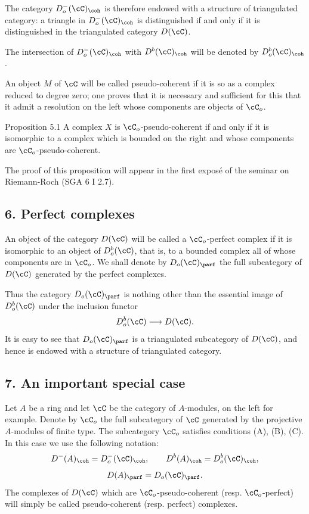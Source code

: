 The category $D_o^-(\cC)_{\coh}$ is therefore endowed with a structure of triangulated category: a triangle in $D_o^-(\cC)_{\coh}$ is distinguished if and only if it is distinguished in the triangulated category $D(\cC)$.

The intersection of $D_o^-(\cC)_{\coh}$ with $D^b(\cC)_{\coh}$ will be denoted by $D_o^b(\cC)_{\coh}$.

An object $M$ of $\cC$ will be called pseudo-coherent if it is so as a complex reduced to degree zero; one proves that it is necessary and sufficient for this that it admit a resolution on the left whose components are objects of $\cC_o$.

\begin{statement}{Proposition 5.1}
A complex $X$ is $\cC_o$-pseudo-coherent if and only if it is isomorphic to a complex which is bounded on the right and whose components are $\cC_o$-pseudo-coherent.
\end{statement}

The proof of this proposition will appear in the first exposé of the seminar on Riemann-Roch (SGA 6 I 2.7).

\subsection*{6. Perfect complexes}

An object of the category $D(\cC)$ will be called a $\cC_o$-perfect complex if it is isomorphic to an object of $D_o^b(\cC)$, that is, to a bounded complex all of whose components are in $\cC_o$. We shall denote by $D_o(\cC)_{\parf}$ the full subcategory of $D(\cC)$ generated by the perfect complexes.

Thus the category $D_o(\cC)_{\parf}$ is nothing other than the essential image of $D_o^b(\cC)$ under the inclusion functor
\[
D_o^b(\cC)\longrightarrow D(\cC).
\]
It is easy to see that $D_o(\cC)_{\parf}$ is a triangulated subcategory of $D(\cC)$, and hence is endowed with a structure of triangulated category.

\subsection*{7. An important special case}

Let $A$ be a ring and let $\cC$ be the category of $A$-modules, on the left for example. Denote by $\cC_o$ the full subcategory of $\cC$ generated by the projective $A$-modules of finite type. The subcategory $\cC_o$ satisfies conditions (A), (B), (C). In this case we use the following notation:
\[
D^-(A)_{\coh}=D_o^-(\cC)_{\coh},\qquad
D^b(A)_{\coh}=D_o^b(\cC)_{\coh},
\]
\[
D(A)_{\parf}=D_o(\cC)_{\parf}.
\]
The complexes of $D(\cC)$ which are $\cC_o$-pseudo-coherent (resp. $\cC_o$-perfect) will simply be called pseudo-coherent (resp. perfect) complexes.

